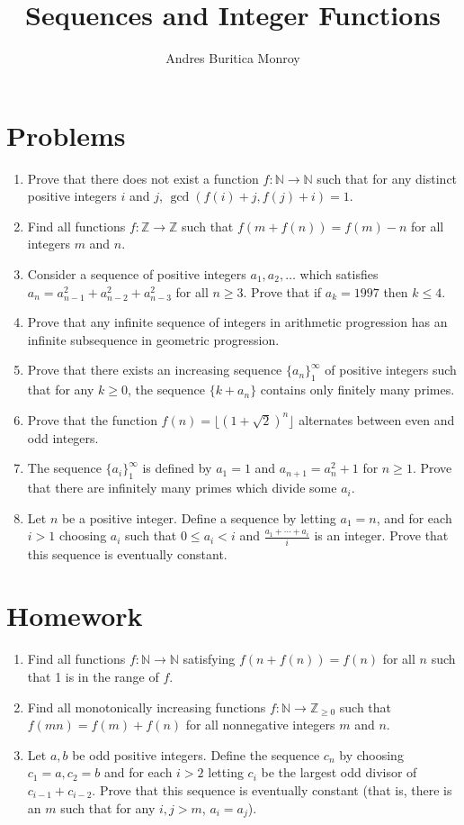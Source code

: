 \documentclass{article}
\title{Sequences and Integer Functions}
\author{Andres Buritica Monroy}
\date{}
\newcommand\Nn{\mathbb{N}}
\newcommand\Zz{\mathbb{Z}}
\begin{document}
\maketitle
\section{Problems}
\begin{enumerate}
  \item Prove that there does not exist a function $f:\Nn\to\Nn$
    such that for any distinct positive integers $i$ and $j$,
    $\gcd(f(i)+j,f(j)+i)=1$.
  \item Find all functions $f:\Zz\to\Zz$ such that $f(m+f(n))=f(m)-n$ for all
    integers $m$ and $n$.
  \item Consider a sequence of positive integers $a_1,a_2,\ldots$ which satisfies
    $a_n=a_{n-1}^2+a_{n-2}^2+a_{n-3}^2$ for all $n\ge 3$. Prove that if
    $a_k=1997$ then $k\le 4$.
  \item Prove that any infinite sequence of integers in arithmetic progression has an
    infinite subsequence in geometric progression.
  \item Prove that there exists an increasing sequence $\{a_n\}_1^\infty$
    of positive integers such that for any $k\ge 0$, the sequence $\{k+a_n\}$
    contains only finitely many primes.
  \item Prove that the function $f(n)=\lfloor(1+\sqrt 2)^n\rfloor$ alternates
    between even and odd integers.
  \item The sequence $\{a_i\}_1^\infty$ is defined by $a_1 = 1$ and
    $a_{n+1}=a_n^2+1$ for $n\ge 1$. Prove that there are infinitely many primes
    which divide some $a_i$.
  \item Let $n$ be a positive integer. Define a sequence by letting $a_1=n$, and
    for each $i>1$ choosing $a_i$ such that $0\le a_i<i$ and
    $\frac{a_1+\cdots+a_i}i$ is an integer. Prove that this sequence is
    eventually constant.
\end{enumerate}
\newpage
\section{Homework}
\begin{enumerate}
  \item Find all functions $f:\Nn\to\Nn$ satisfying $f(n+f(n))=f(n)$ for all
    $n$ such that 1 is in the range of $f$.
  \item Find all monotonically increasing functions $f:\Nn\to\Zz_{\ge 0}$ such that $f(mn)=f(m)+f(n)$ for
    all nonnegative integers $m$ and $n$.
  \item Let $a,b$ be odd positive integers. Define the sequence $c_n$ by
    choosing $c_1=a,c_2=b$ and for each $i>2$ letting $c_i$ be the largest odd
    divisor of $c_{i-1}+c_{i-2}$. Prove that this sequence is eventually
    constant
    (that is, there is an $m$ such that for any $i,j>m$, $a_i=a_j$).
\end{enumerate}
\end{document}
